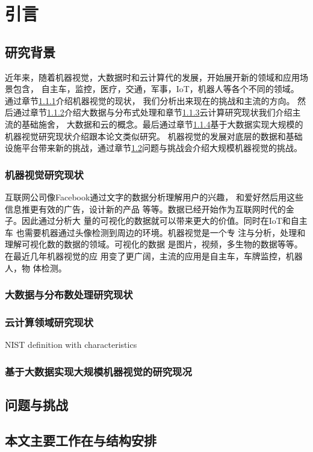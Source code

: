 \chapter{引言}
\label{cha:intro}


\section{研究背景}
\label{sec:background}
近年来，随着机器视觉，大数据时和云计算代的发展，开始展开新的领域和应用场景包含，
自主车，监控，医疗，交通，军事，IoT，机器人等各个不同的领域。
通过章节\ref{subsec:cv_background}介绍机器视觉的现状，
我们分析出来现在的挑战和主流的方向。
然后通过章节\ref{subsec:bigdata_background}介绍大数据与分布式处理和章节\ref{subsec:cloud_background}云计算研究现状我们介绍主流的基础施舍，
大数据和云的概念。最后通过章节\ref{subsec:bigdata_cv_background}基于大数据实现大规模的机器视觉研究现状介绍跟本论文类似研究。
机器视觉的发展对底层的数据和基础设施平台带来新的挑战，通过章节\ref{sec:challenges}问题与挑战会介绍大规模机器视觉的挑战。

\subsection{机器视觉研究现状}
\label{subsec:cv_background}

互联网公司像Facebook通过文字的数据分析理解用户的兴趣，
和爱好然后用这些信息推更有效的广告，设计新的产品
等等。数据已经开始作为互联网时代的金子。因此通过分析大
量的可视化的数据就可以带来更大的价值。同时在IoT和自主车
也需要机器通过头像检测到周边的环境。机器视觉是一个专
注与分析，处理和理解可视化数的数据的领域。可视化的数据
是图片，视频，多生物的数据等等。在最近几年机器视觉的应
用变了更广阔，主流的应用是自主车，车牌监控，机器人，物
体检测。

\subsection{大数据与分布数处理研究现状}
\label{subsec:bigdata_background}

\subsection{云计算领域研究现状}
\label{subsec:cloud_background}
NIST definition with characteristics

\subsection{基于大数据实现大规模机器视觉的研究现况}
\label{subsec:bigdata_cv_background}

\section{问题与挑战}
\label{sec:challenges}

\section{本文主要工作在与结构安排}
\label{sec:main_work}
